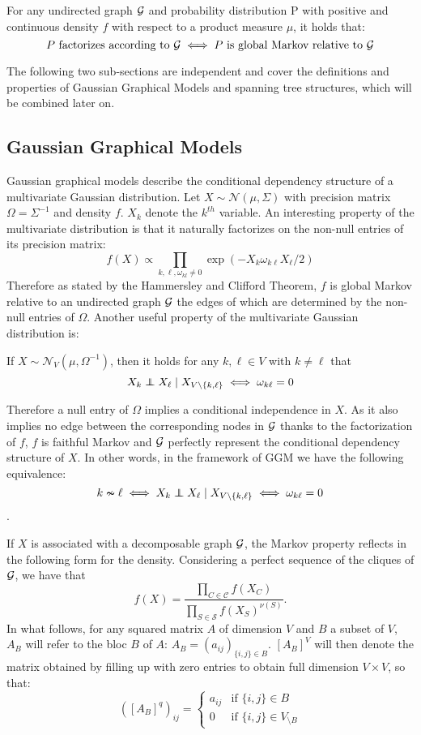 \begin{theorem}
For any undirected graph $\mathcal{G}$ and probability distribution P with positive and continuous density $f$ with respect to a product measure $\mu$, it holds that:
$$P\text{ factorizes according to } \mathcal{G} \iff P\text{ is global Markov relative to }\mathcal{G} $$
\end{theorem}

 The following two sub-sections are independent and cover the definitions and properties of Gaussian Graphical Models and spanning tree structures, which will be combined later on.
 
 \subsection{Gaussian Graphical Models}
 Gaussian graphical models describe the conditional dependency structure of a  multivariate Gaussian distribution. Let $X\sim \mathcal{N}(\mu, \Sigma)$ with precision matrix $\Omega=\Sigma^{-1}$ and density $f$. $X_k$ denote the $k^{th}$ variable. An interesting property of the multivariate distribution is that it naturally factorizes on the non-null entries of its precision matrix:
 $$f(X) \propto \prod_{k,\ell, \omega_{kl}\neq 0} \exp(-X_{k}\omega_{k\ell}X_{\ell}/2)$$
 Therefore as stated by the Hammersley and Clifford Theorem, $f$ is global Markov relative to an undirected graph $\mathcal{G}$ the edges of which are determined by the non-null entries of $\Omega$.  Another useful property of the multivariate Gaussian distribution is:
 
 \begin{prop}If  $X\sim \mathcal{N}_V(\mu, \Omega^{-1})$, then it holds for any $k,\ell\in V$ with $k\neq \ell$ that
$$X_k \independent X_\ell \mid X_{V\setminus\{k,\ell\}} \iff \omega_{k\ell}=0 $$
 \end{prop}
 
Therefore a null entry of $\Omega$ implies a conditional independence in $X$. As it also implies no edge between the corresponding nodes in $\mathcal{G}$ thanks to the factorization of $f$, $f$ is faithful Markov and $\mathcal{G}$ perfectly represent the conditional dependency structure of $X$. In other words, in the framework of GGM we have the following equivalence:
 $$k\nsim \ell \iff  X_k \independent X_\ell \mid X_{V\setminus\{k,\ell\}} \iff \omega_{k\ell}=0$$. 
 
 If $X$ is associated with a decomposable graph $\mathcal{G}$, the Markov property reflects in the following form for the density. Considering a perfect sequence of the cliques of $\mathcal{G}$, we have that
 $$f(X)=\dfrac{\prod_{C\in \mathcal{C}} f(X_C)}{\prod_{S\in \mathcal{S}} f(X_S)^{\nu(S)}}.$$
 In what follows, for any  squared  matrix $A$ of dimension $V$ and $B$ a subset of $V$, $A_B$ will refer to the bloc $B$ of $A$: $A_{B}=(a_{ij})_{\{i,j\}\in B}$.   $[A_B]^V$ will then denote the matrix obtained by filling up with zero entries to obtain full dimension $V\times V$, so that:
$$([A_B]^q )_{ij}=\left\{ \begin{array}{rl}
a_{ij} & \text{if } \{i,j\}\in B\\
0 &  \text{if } \{i,j\}\in V_{\setminus B}
\end{array}\right.$$


